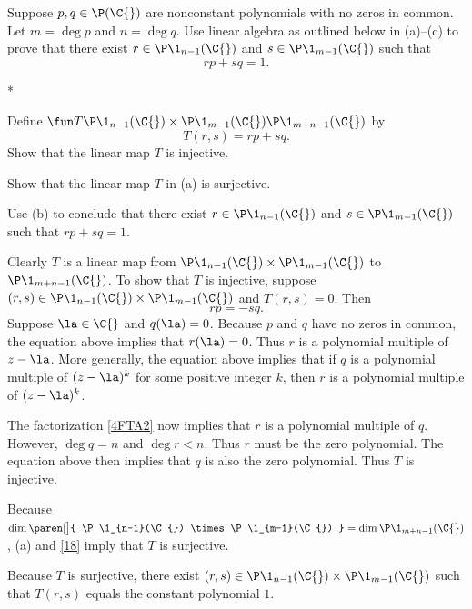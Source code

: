 \exercise
Suppose $p, q \in \P(\C{})$ are nonconstant polynomials with no zeros in common. Let $m = \deg p$ and $n = \deg q$. Use linear algebra as outlined below in (a)--(c) to prove that there exist
$r \in \P\1_{n-1}(\C{})$ and $s \in \P\1_{m-1}(\C{})$ such that
\[
rp + sq = 1.
\]
\begin{subtheorem}*
\item
Define $\fun T { \P\1_{n-1}(\C{}) \times \P\1_{m-1}(\C{}) } {\P\1_{m+n-1}(\C{})}$ by
\[
T(r, s) = rp + sq.
\]
Show that the linear map $T$ is injective.
\item
Show that the linear map $T$ in (a) is surjective.
\item
Use (b) to conclude that there exist $r \in \P\1_{n-1}(\C{})$ and $s \in \P\1_{m-1}(\C{})$ such that $rp + sq = 1$.
\end{subtheorem}
\exercisesubtheoremend

\begin{Solution}
\begin{subtheorem}
\item
Clearly $T$ is a linear map from $\P\1_{n-1}(\C{}) \times \P\1_{m-1}(\C{})$ to ${\P\1_{m+n-1}(\C{})}$. To show that $T$ is injective, suppose
$(r, s) \in \P\1_{n-1}(\C{}) \times \P\1_{m-1}(\C{})$ and $T(r, s) = 0$. Then
\[
rp = -sq.
\]
Suppose $\la \in \C{}$ and $q(\la) = 0$. Because $p$ and $q$ have no zeros in common, the equation above implies that $r(\la) = 0$. Thus $r$ is a polynomial multiple of $z-\la$. More generally, the equation above implies that if $q$ is a polynomial multiple of $(z-\la)^k$ for some positive integer $k$, then $r$ is a polynomial multiple of $(z - \la)^k$.

The factorization \ref{4FTA2} now implies that $r$ is a polynomial multiple of $q$. However, $\deg q = n$ and
$\deg r < n$. Thus $r$ must be the zero polynomial. The equation above then implies that $q$ is also the zero polynomial. Thus $T$ is injective.

\item
Because $\dim \paren[\big]{ \P\1_{n-1}(\C{}) \times \P\1_{m-1}(\C{}) } = \dim \P\1_{m+n-1}(\C{})$, (a) and \ref{18} imply that $T$ is surjective.

\item
Because $T$ is surjective, there exist $(r, s) \in \P\1_{n-1}(\C{}) \times \P\1_{m-1}(\C{})$ such that $T(r, s)$ equals the constant polynomial $1$.
\end{subtheorem}
\end{Solution}

